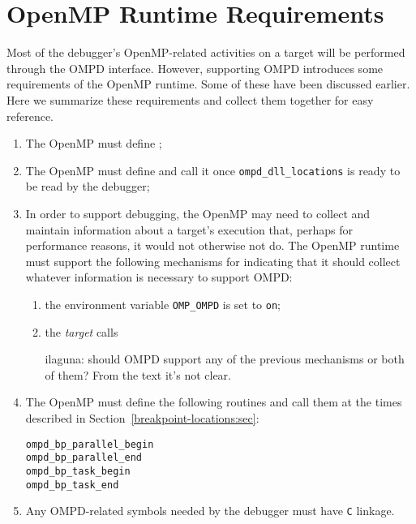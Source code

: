 \section{OpenMP Runtime Requirements}
\label{openmp-runtime-requirements:sec}

Most of the debugger's OpenMP-related activities on a target will
be performed through the OMPD interface.
However, supporting OMPD introduces some requirements of the OpenMP runtime.
Some of these have been discussed earlier.
Here we summarize these requirements and collect them together
for easy reference.

\begin{enumerate}
\item
  The OpenMP must define
  ;
\item
  The OpenMP must define
  and call it once \texttt{ompd\_dll\_locations} is ready to be
  read by the debugger;
\item
  In order to support debugging, the OpenMP may need to collect and
  maintain information about a target's execution that, perhaps for
  performance reasons, it would not otherwise not do.
  The OpenMP runtime must support the following mechanisms for
  indicating that it should collect whatever information is
  necessary to support OMPD:
  \begin{enumerate}
  \item
    the environment variable \texttt{OMP\_OMPD} is set to \texttt{on};
  \item
    the \emph{target} calls
\begin{notes}
ilaguna: should OMPD support any of the previous mechanisms or both of 
them? From the text it's not clear.
\end{notes}
  \end{enumerate}
\item
  The OpenMP must define the following routines and call them at the
  times described in Section~\ref{breakpoint-locations:sec}:
  \begin{description}
  \item [\texttt{ompd\_bp\_parallel\_begin}]
  \item [\texttt{ompd\_bp\_parallel\_end}]
  \item [\texttt{ompd\_bp\_task\_begin}]
  \item [\texttt{ompd\_bp\_task\_end}]
  \end{description}
\item
  Any OMPD-related symbols needed by the debugger must have \texttt{C} linkage.
\end{enumerate}

